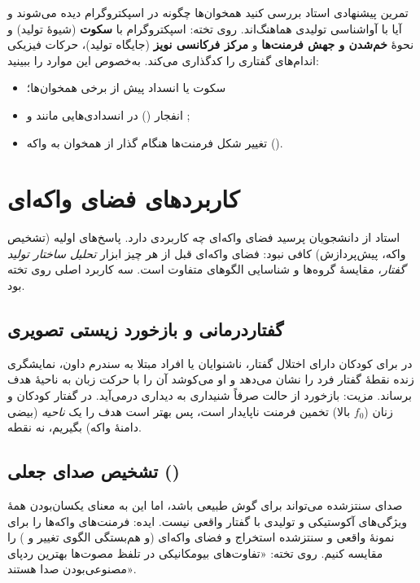 \begin{assignmentbox}{تمرین پیشنهادی استاد}
بررسی کنید همخوان‌ها چگونه در اسپکتروگرام دیده می‌شوند و آیا با آواشناسی تولیدی هماهنگ‌اند. روی تخته: اسپکتروگرام با \textbf{سکوت} (شیوهٔ تولید) و نحوهٔ \textbf{خم‌شدن و جهش فرمنت‌ها} و \textbf{مرکز فرکانسی نویز} (جایگاه تولید)، حرکات فیزیکی اندام‌های گفتاری را کدگذاری می‌کند. به‌خصوص این موارد را ببینید:
\begin{itemize}
  \item سکوت یا انسداد پیش از برخی همخوان‌ها؛
  \item انفجار () در انسدادی‌هایی مانند  و ;
  \item تغییر شکل فرمنت‌ها هنگام گذار از همخوان به واکه ().
\end{itemize}
\end{assignmentbox}

\section{کاربردهای فضای واکه‌ای}
استاد از دانشجویان پرسید فضای واکه‌ای چه کاربردی دارد. پاسخ‌های اولیه (تشخیص واکه، پیش‌پردازش) کافی نبود: فضای واکه‌ای قبل از هر چیز ابزار \emph{تحلیل ساختار تولید گفتار}، مقایسهٔ گروه‌ها و شناسایی الگوهای متفاوت است. سه کاربرد اصلی روی تخته بود.

\subsection{گفتاردرمانی و بازخورد زیستی تصویری}
در  برای کودکان دارای اختلال گفتار، ناشنوایان یا افراد مبتلا به سندرم داون، نمایشگری زنده نقطهٔ  گفتار فرد را نشان می‌دهد و او می‌کوشد آن را با حرکت زبان به ناحیهٔ هدف برساند. مزیت: بازخورد از حالت صرفاً شنیداری به دیداری درمی‌آید. در گفتار کودکان و زنان ($f_0$ بالا) تخمین فرمنت ناپایدار است، پس بهتر است هدف را یک \emph{ناحیه} (بیضی دامنهٔ واکه) بگیریم، نه نقطه.

\subsection{تشخیص صدای جعلی ()}
صدای سنتزشده می‌تواند برای گوش طبیعی باشد، اما این به معنای یکسان‌بودن همهٔ ویژگی‌های آکوستیکی و تولیدی با گفتار واقعی نیست. ایده: فرمنت‌های واکه‌ها را برای نمونهٔ واقعی و سنتزشده استخراج و فضای واکه‌ای (و هم‌بستگی الگوی تغییر  و ) را مقایسه کنیم. روی تخته: «تفاوت‌های بیومکانیکی در تلفظ مصوت‌ها بهترین ردپای مصنوعی‌بودن صدا هستند».

